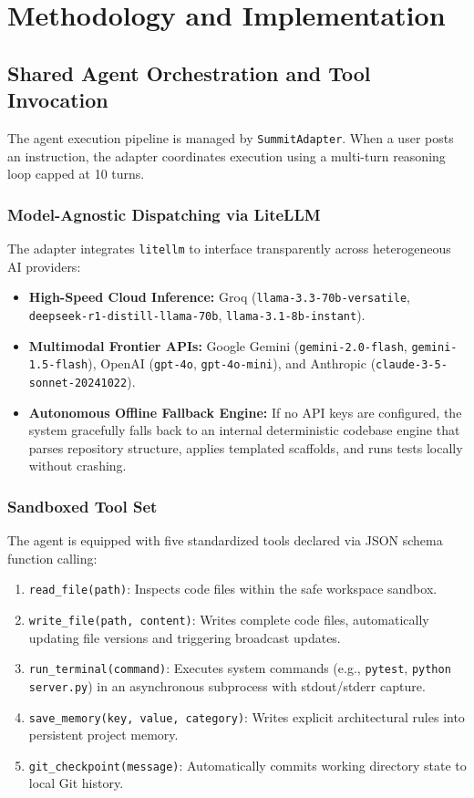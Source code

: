 \documentclass[conference]{IEEEtran}
\begin{document}
\section{Methodology and Implementation}

\subsection{Shared Agent Orchestration and Tool Invocation}
The agent execution pipeline is managed by \texttt{SummitAdapter}. When a user posts an instruction, the adapter coordinates execution using a multi-turn reasoning loop capped at 10 turns.

\subsubsection{Model-Agnostic Dispatching via LiteLLM}
The adapter integrates \texttt{litellm} to interface transparently across heterogeneous AI providers:
\begin{itemize}
    \item \textbf{High-Speed Cloud Inference:} Groq (\texttt{llama-3.3-70b-versatile}, \texttt{deepseek-r1-distill-llama-70b}, \texttt{llama-3.1-8b-instant}).
    \item \textbf{Multimodal Frontier APIs:} Google Gemini (\texttt{gemini-2.0-flash}, \texttt{gemini-1.5-flash}), OpenAI (\texttt{gpt-4o}, \texttt{gpt-4o-mini}), and Anthropic (\texttt{claude-3-5-sonnet-20241022}).
    \item \textbf{Autonomous Offline Fallback Engine:} If no API keys are configured, the system gracefully falls back to an internal deterministic codebase engine that parses repository structure, applies templated scaffolds, and runs tests locally without crashing.
\end{itemize}

\subsubsection{Sandboxed Tool Set}
The agent is equipped with five standardized tools declared via JSON schema function calling:
\begin{enumerate}
    \item \texttt{read\_file(path)}: Inspects code files within the safe workspace sandbox.
    \item \texttt{write\_file(path, content)}: Writes complete code files, automatically updating file versions and triggering broadcast updates.
    \item \texttt{run\_terminal(command)}: Executes system commands (e.g., \texttt{pytest}, \texttt{python server.py}) in an asynchronous subprocess with stdout/stderr capture.
    \item \texttt{save\_memory(key, value, category)}: Writes explicit architectural rules into persistent project memory.
    \item \texttt{git\_checkpoint(message)}: Automatically commits working directory state to local Git history.
\end{enumerate}
\end{document}
